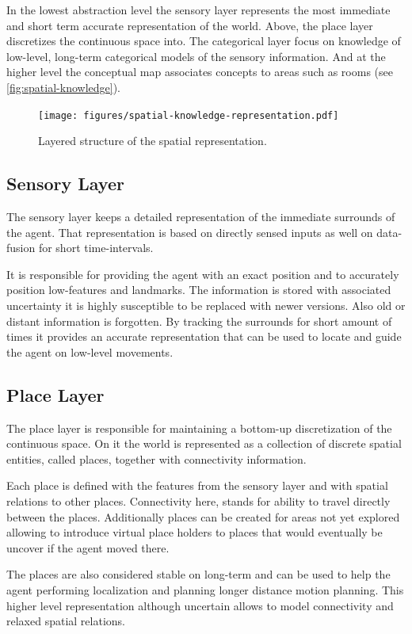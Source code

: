 In the lowest abstraction level the sensory layer represents the most immediate and short term
accurate representation of the world. Above, the place layer discretizes the continuous
space into. The categorical layer focus on knowledge of low\hyp{}level, long\hyp{}term
categorical models of the sensory information. And at the higher level the conceptual map
associates concepts to areas such as rooms (see \autoref{fig:spatial-knowledge}).

\begin{figure}[h]
\centering
\texttt{[image: figures/spatial-knowledge-representation.pdf]}
\caption{\label{fig:spatial-knowledge}Layered structure of the spatial representation.}
\end{figure}

\subsection{Sensory Layer}
The sensory layer keeps a detailed representation of the immediate surrounds of the agent.
That representation is based on directly sensed inputs as well on data-fusion for short
time\hyp{}intervals.

It is responsible for providing the agent with an exact position and to accurately position
low\hyp{}features and landmarks. The information is stored with associated uncertainty it
is highly susceptible to be replaced with newer versions. Also old or distant information
is forgotten.
By tracking the surrounds for short amount of times it provides an accurate representation
that can be used to locate and guide the agent on low\hyp{}level movements.

\subsection{Place Layer}
The place layer is responsible for maintaining a bottom\hyp{}up discretization of the
continuous space. On it the world is represented as a collection of discrete spatial
entities, called places, together with connectivity information.

Each place is defined with the features from the sensory layer and with spatial relations
to other places. Connectivity here, stands for ability to travel directly between the
places. Additionally places can be created for areas not yet explored allowing to introduce
virtual place holders to places that would eventually be uncover if the agent moved there.

The places are also considered stable on long\hyp{}term and can be used to help the agent
performing localization and planning longer distance motion planning. This higher level
representation although uncertain allows to model connectivity and relaxed spatial relations.

